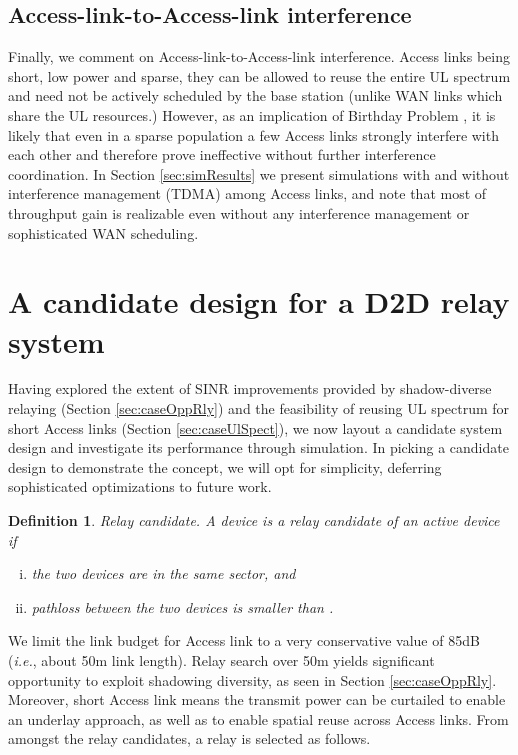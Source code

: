 \documentclass[journal]{IEEEtran}
\newtheorem{definit}{Definition}
\newcommand{\ie}{\emph{i.e.}}
\begin{document}
\subsection{Access-link-to-Access-link interference}
Finally, we comment on Access-link-to-Access-link interference.  Access links being short, low power and sparse, they can be allowed to reuse the entire UL spectrum and need not be actively scheduled by the base station (unlike WAN links which share the UL resources.)  However, as an implication of Birthday Problem \cite{Grimmett3rdEd}, it is likely that even in a sparse population a few Access links strongly interfere with each other and therefore prove ineffective without further interference coordination.  In Section \ref{sec:simResults} we present simulations with and without interference management (TDMA) among Access links, and note that most of throughput gain is realizable even without any interference management or sophisticated WAN scheduling.


\section{A candidate design for a D2D relay system}\label{sec:propDesign}
Having explored the extent of SINR improvements provided by shadow-diverse relaying (Section \ref{sec:caseOppRly}) and the feasibility of reusing UL spectrum for short Access links (Section \ref{sec:caseUlSpect}), we now layout a candidate system design and investigate its performance through simulation. In picking a candidate design to demonstrate the concept, we will opt for simplicity, deferring sophisticated optimizations to future work.

\begin{definit}
	{\em Relay candidate.} A device is a relay candidate of an active device if
	\begin{enumerate}[i.]
		\item the two devices are in the same sector, and
		\item pathloss between the two devices is smaller than .
	\end{enumerate}
\end{definit}

We limit the link budget for Access link  to a very conservative value of 85dB (\ie, about 50m link length).  Relay search over 50m yields significant opportunity to exploit shadowing diversity, as seen in Section \ref{sec:caseOppRly}.  Moreover, short Access link means the transmit power can be curtailed to enable an underlay approach, as well as to enable spatial reuse across Access links.  From amongst the relay candidates, a relay is selected as follows.
\end{document}
